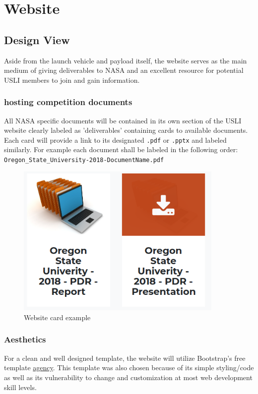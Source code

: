 \documentclass[onecolumn, draftclsnofoot,10pt, compsoc]{IEEEtran}
\def\code#1{\texttt{#1}}
\begin{document}
\section{Website}
\subsection{Design View}
Aside from the launch vehicle and payload itself, the website serves as the main medium of giving deliverables to NASA and an excellent resource for potential USLI members to join and gain information.
\subsubsection{hosting competition documents}
All NASA specific documents will be contained in its own section of the USLI website clearly labeled as 'deliverables' containing cards to available documents. Each card will provide a link to its designated \code{.pdf} or \code{.pptx} and labeled similarly. For example each document shall be labeled in the  following order:\\\code{Oregon\_State\_University-2018-DocumentName.pdf}
\begin{figure}[h]
	\begin{center}
		\caption{Website card example}
		\includegraphics[width=10cm]{WebsiteCardExample}
	\end{center}
\end{figure}

\subsubsection{Aesthetics}
For a clean and well designed template, the website will utilize Bootstrap's free template \href{https://startbootstrap.com/template-overviews/agency/}{agency}. This template was also chosen because of its simple styling/code as well as its vulnerability to change and customization at most web development skill levels.
\end{document}

